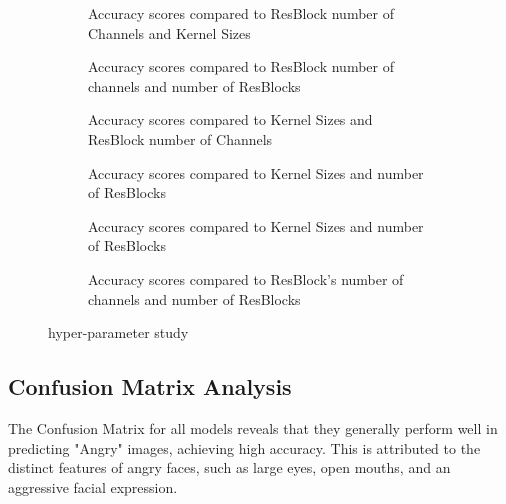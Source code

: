 \begin{figure}[h]
	\centering
	\begin{subfigure}{0.48\linewidth}
		\centering
		
		\caption{Accuracy scores compared to ResBlock number of Channels and  Kernel Sizes }
		\label{fig:BvK}
	\end{subfigure}
	\begin{subfigure}{0.48\linewidth}
		\centering
		
		\caption{Accuracy scores compared to ResBlock number of channels and number of ResBlocks}
		\label{fig:BvN}
	\end{subfigure}
	
	\begin{subfigure}{0.48\linewidth}
		\centering
		
		\caption{Accuracy scores compared to Kernel Sizes and ResBlock number of Channels}
		\label{fig:KvB}
	\end{subfigure}
	\begin{subfigure}{0.48\linewidth}
		\centering
		
		\caption{Accuracy scores compared to Kernel Sizes and number of ResBlocks}
		\label{fig:KvN}
	\end{subfigure}
	
	\begin{subfigure}{0.48\linewidth}
		\centering
		
		\caption{Accuracy scores compared to Kernel Sizes and number of ResBlocks}
		\label{fig:NvK}
	\end{subfigure}
	\begin{subfigure}{0.48\linewidth}
		\centering
		
		\caption{Accuracy scores compared to ResBlock's number of channels and number of ResBlocks}
		\label{fig:NvB}
	\end{subfigure}
	
	\caption{hyper-parameter study}
	\label{fig:overall}
\end{figure}


\newpage
\subsection{Confusion Matrix Analysis}


The Confusion Matrix for all models reveals that they generally perform well in predicting "Angry" images, achieving high accuracy. This is attributed to the distinct features of angry faces, such as large eyes, open mouths, and an aggressive facial expression.


